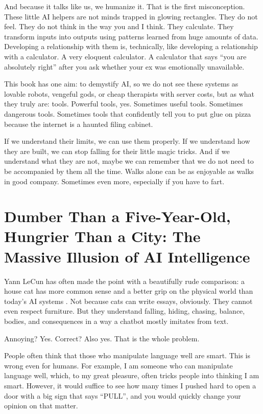 \documentclass[12pt,oneside]{book}
\begin{document}
And because it talks like us, we humanize it. That is the first misconception. These little AI helpers are not minds trapped in glowing rectangles. They do not feel. They do not think in the way you and I think. They calculate. They transform inputs into outputs using patterns learned from huge amounts of data. Developing a relationship with them is, technically, like developing a relationship with a calculator. A very eloquent calculator. A calculator that says ``you are absolutely right'' after you ask whether your ex was emotionally unavailable.

This book has one aim: to demystify AI, so we do not see these systems as lovable robots, vengeful gods, or cheap therapists with server costs, but as what they truly are: tools. Powerful tools, yes. Sometimes useful tools. Sometimes dangerous tools. Sometimes tools that confidently tell you to put glue on pizza because the internet is a haunted filing cabinet.

If we understand their limits, we can use them properly. If we understand how they are built, we can stop falling for their little magic tricks. And if we understand what they are not, maybe we can remember that we do not need to be accompanied by them all the time. Walks alone can be as enjoyable as walks in good company. Sometimes even more, especially if you have to fart.

\chapter{Dumber Than a Five-Year-Old, Hungrier Than a City: The Massive Illusion of AI Intelligence}

Yann LeCun has often made the point with a beautifully rude comparison: a house cat has more common sense and a better grip on the physical world than today's AI systems \parencite{lecun2022}. Not because cats can write essays, obviously. They cannot even respect furniture. But they understand falling, hiding, chasing, balance, bodies, and consequences in a way a chatbot mostly imitates from text.

Annoying? Yes. Correct? Also yes. That is the whole problem.

People often think that those who manipulate language well are smart. This is wrong even for humans. For example, I am someone who can manipulate language well, which, to my great pleasure, often tricks people into thinking I am smart. However, it would suffice to see how many times I pushed hard to open a door with a big sign that says ``PULL'', and you would quickly change your opinion on that matter.
\end{document}
